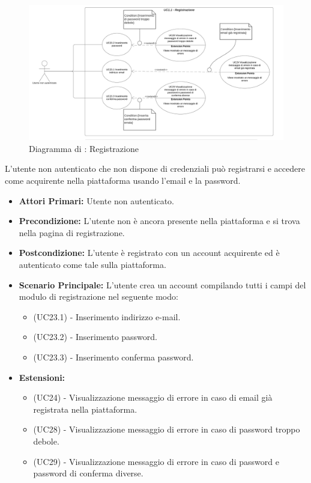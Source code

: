 
\begin{figure}[H]
    \centering
    \includegraphics[scale=0.6]{Immagini/DiagrammiUC/UC1.1Registrazione}
    \caption{Diagramma di \actualUC: Registrazione}
    \label{fig:Registrazione}
\end{figure}

L'utente non autenticato che non dispone di credenziali può registrarsi e accedere come acquirente nella piattaforma usando l'email e la password.
\begin{itemize}
    \item \textbf{Attori Primari:} Utente non autenticato.
    \item \textbf{Precondizione:} L'utente non è ancora presente nella piattaforma e si trova nella pagina di registrazione.
    \item \textbf{Postcondizione:} L'utente è registrato con un account acquirente ed è autenticato come tale sulla piattaforma.
    \item \textbf{Scenario Principale:} L'utente crea un account compilando tutti i campi del modulo di registrazione nel seguente modo:
    \begin{itemize}
        \item (UC23.1) - Inserimento indirizzo e-mail.
        \item (UC23.2) - Inserimento password.
        \item (UC23.3) - Inserimento conferma password.
    \end{itemize}
    \item \textbf{Estensioni:}
    \begin{itemize}
        \item (UC24) - Visualizzazione messaggio di errore in caso di email già registrata nella piattaforma.
        \item (UC28) - Visualizzazione messaggio di errore in caso di password troppo debole. 
        \item (UC29) - Visualizzazione messaggio di errore in caso di password e password di conferma diverse. 
    \end{itemize}
\end{itemize}


